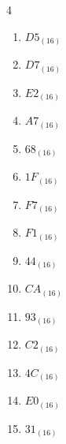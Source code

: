 \begin{multicols}{4}
\begin{enumerate}
        \phantom{$=36$}

  \item $D5_{(16)}$

        \phantom{$=213$}

  \item $D7_{(16)}$

        \phantom{$=215$}

  \item $E2_{(16)}$

        \phantom{$=226$}

  \item $A7_{(16)}$

        \phantom{$=167$}

  \item $68_{(16)}$

        \phantom{$=104$}

  \item $1F_{(16)}$

        \phantom{$=31$}

\columnbreak %

  \item $F7_{(16)}$

        \phantom{$=247$}

  \item $F1_{(16)}$

        \phantom{$=241$}

  \item $44_{(16)}$

        \phantom{$=68$}

  \item $CA_{(16)}$

        \phantom{$=202$}

  \item $93_{(16)}$

        \phantom{$=147$}

  \item $C2_{(16)}$

        \phantom{$=194$}

  \item $4C_{(16)}$

        \phantom{$=76$}

  \item $E0_{(16)}$

        \phantom{$=224$}

  \item $31_{(16)}$

        \phantom{$=49$}


\end{enumerate}
\end{multicols}
